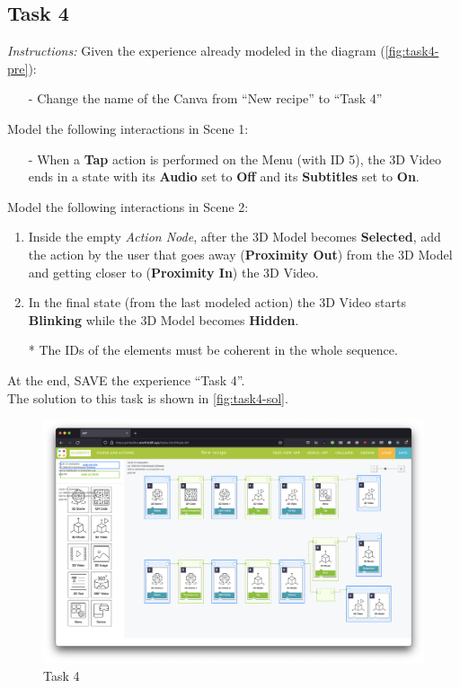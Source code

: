 \subsection*{Task 4}
\textit{Instructions:} 
Given the experience already modeled in the diagram (\autoref{fig:task4-pre}):
\begin{itemize}
    \item[-] Change the name of the Canva from “New recipe” to “Task 4”
\end{itemize}
Model the following interactions in Scene 1:
\begin{itemize}
    \item[-]When a \textbf{Tap} action is performed on the Menu (with ID 5), the 3D Video ends in a state with its \textbf{Audio} set to \textbf{Off} and its \textbf{Subtitles} set to \textbf{On}.
\end{itemize}
Model the following interactions in Scene 2:
\begin{enumerate}
    \item Inside the empty \textit{Action Node}, after the 3D Model becomes \textbf{Selected}, add the action by the user that goes away (\textbf{Proximity Out}) from the 3D Model and getting closer to (\textbf{Proximity In}) the 3D Video.
    \item In the final state (from the last modeled action) the 3D Video starts \textbf{Blinking} while the 3D Model becomes \textbf{Hidden}.
    \item[*] The IDs of the elements must be coherent in the whole sequence.
\end{enumerate}
At the end, SAVE the experience “Task 4”. \\
The solution to this task is shown in \autoref{fig:task4-sol}.
\begin{figure}[h]
    \centering
    \includegraphics[width=\linewidth]{Figures/Evaluation/Tasks/task4-pre.png}
    \caption{Task 4}
    \label{fig:task4-pre}
\end{figure}


